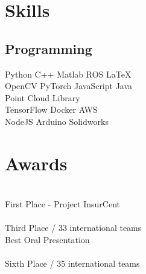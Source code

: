 \documentclass[letterpaper]{deedy-resume} %
\begin{document}
\begin{minipage}[t]{0.25\textwidth}
\sectionspace %


\section{Skills}

\subsection{Programming}

Python \textbullet{} C++ \textbullet{} Matlab \textbullet{}ROS \textbullet{} \LaTeX\ \\ 
\sectionspace
{}
OpenCV \textbullet{} PyTorch \textbullet{} JavaScript \textbullet{} Java \\
Point Cloud Library \\
\sectionspace
{}
TensorFlow \textbullet{} Docker \textbullet{} AWS \\
NodeJS \textbullet{} Arduino \textbullet{} Solidworks


\sectionspace %
\section{Awards}
\textbullet{}  \\
First Place - Project InsurCent \\
\textbullet{} \\
Third Place / 33 international teams\\
Best Oral Presentation \\
\textbullet{}  \\ Sixth Place / 35 international teams

\end{minipage} %
\hfill
%
\end{document}
